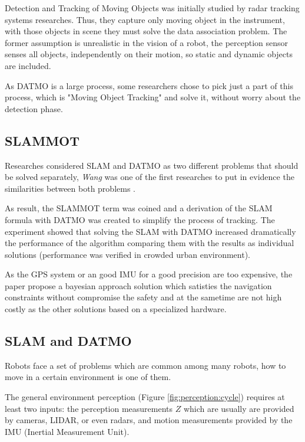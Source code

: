 Detection and Tracking of Moving Objects was initially studied by radar tracking systems \cite{VU-2009-454238} researches. Thus, they capture only moving object in the instrument, with those objects in scene they must solve the data association problem. The former assumption is unrealistic in the vision of a robot, the perception sensor senses all objects, independently on their motion, so static and dynamic objects are included.

As DATMO is a large process, some researchers chose to pick just a part of this process, which is "Moving Object Tracking" and solve it, without worry about the detection phase.

\subsection{SLAMMOT}

Researches considered SLAM and DATMO as two different problems that should be solved separately, \textit{Wang} was one of the first researches to put in evidence the similarities between both problems \cite{Wang03onlinesimultaneous}.

As result, the SLAMMOT term was coined and a derivation of the SLAM formula with DATMO was created to simplify the process of tracking. The experiment showed that solving the SLAM with DATMO increased dramatically the performance of the algorithm comparing them with the results as individual solutions (performance was verified in crowded urban environment).

As the GPS system or an good IMU for a good precision are too expensive, the paper propose a bayesian approach solution which satisties the navigation constraints without compromise the safety and at the sametime are not high costly as the other solutions based on a specialized hardware.

\subsection{SLAM and DATMO}

Robots face a set of problems which are common among many robots, how to move in a certain environment is one of them.

The general environment perception (Figure \ref{fig:perception:cycle}) requires at least two inputs: the perception measurements $Z$ which are usually are provided by cameras, LIDAR, or even radars, and motion measurements provided by the IMU (Inertial Measurement Unit).


